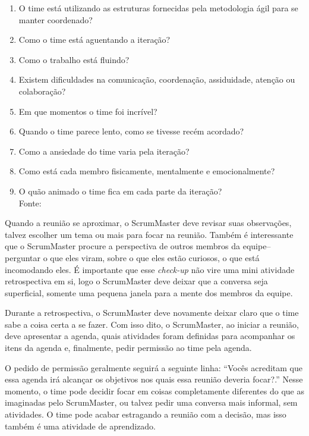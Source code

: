 \documentclass{iiufrgs}
\newcommand{\fonte}[1]{\\Fonte: {#1}}
\begin{document}
\begin{enumerate}[leftmargin=3em, noitemsep, nosep, before=\vspace{1cm}, after=\vspace{1cm}]
    \setlength{\itemindent}{1em}
    \item O time está utilizando as estruturas fornecidas pela metodologia ágil para se manter coordenado?
    \item Como o time está aguentando a iteração?
    \item Como o trabalho está fluindo?
    \item Existem dificuldades na comunicação, coordenação, assiduidade, atenção ou colaboração?
    \item Em que momentos o time foi incrível?
    \item Quando o time parece lento, como se tivesse recém acordado?
    \item Como a ansiedade do time varia pela iteração?
    \item Como está cada membro fisicamente, mentalmente e emocionalmente?
    \item O quão animado o time fica em cada parte da iteração?
    \fonte{\cite{Adkins2010Coaching}}
\end{enumerate}

Quando a reunião se aproximar, o ScrumMaster deve revisar suas observações, talvez escolher um tema ou mais para focar na reunião. Também é interessante que o ScrumMaster procure a perspectiva de outros membros da equipe--perguntar o que eles viram, sobre o que eles estão curiosos, o que está incomodando eles. É importante que esse \textit{check-up} não vire uma mini atividade retrospectiva em si, logo o ScrumMaster deve deixar que a conversa seja superficial, somente uma pequena janela para a mente dos membros da equipe.

Durante a retrospectiva, o ScrumMaster deve novamente deixar claro que o time sabe a coisa certa a se fazer. Com isso dito, o ScrumMaster, ao iniciar a reunião, deve apresentar a agenda, quais atividades foram definidas para acompanhar os itens da agenda e, finalmente, pedir permissão ao time pela agenda.

O pedido de permissão geralmente seguirá a seguinte linha: \enquote{Vocês acreditam que essa agenda irá alcançar os objetivos nos quais essa reunião deveria focar?.} Nesse momento, o time pode decidir focar em coisas completamente diferentes do que as imaginadas pelo ScrumMaster, ou talvez pedir uma conversa mais informal, sem atividades. O time pode acabar estragando a reunião com a decisão, mas isso também é uma atividade de aprendizado.
\end{document}

